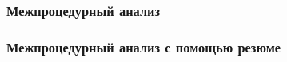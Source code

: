 \documentclass[hyperref={pdfpagelabels=false},10pt,gray]{beamer}
\begin{document}

\begin{frame}
\frametitle{Межпроцедурный анализ}
\begin{figure}[h]
\end{figure}
\end{frame}


\begin{frame}
\frametitle{Межпроцедурный анализ с помощью резюме}
\begin{figure}[h]
\end{figure}
\end{frame}

\end{document}
